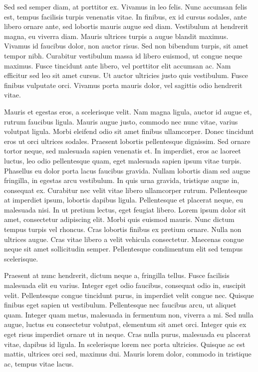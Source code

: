 Sed sed semper diam, at porttitor ex. Vivamus in leo felis. Nunc accumsan felis est, tempus facilisis turpis venenatis vitae. In finibus, ex id cursus sodales, ante libero ornare ante, sed lobortis mauris augue sed diam. Vestibulum at hendrerit magna, eu viverra diam. Mauris ultrices turpis a augue blandit maximus. Vivamus id faucibus dolor, non auctor risus. Sed non bibendum turpis, sit amet tempor nibh. Curabitur vestibulum massa id libero euismod, ut congue neque maximus. Fusce tincidunt ante libero, vel porttitor elit accumsan ac. Nam efficitur sed leo sit amet cursus. Ut auctor ultricies justo quis vestibulum. Fusce finibus vulputate orci. Vivamus porta mauris dolor, vel sagittis odio hendrerit vitae.

Mauris et egestas eros, a scelerisque velit. Nam magna ligula, auctor id augue et, rutrum faucibus ligula. Mauris augue justo, commodo nec nunc vitae, varius volutpat ligula. Morbi eleifend odio sit amet finibus ullamcorper. Donec tincidunt eros ut orci ultrices sodales. Praesent lobortis pellentesque dignissim. Sed ornare tortor neque, sed malesuada sapien venenatis et. In imperdiet, eros ac laoreet luctus, leo odio pellentesque quam, eget malesuada sapien ipsum vitae turpis. Phasellus eu dolor porta lacus faucibus gravida. Nullam lobortis diam sed augue fringilla, in egestas arcu vestibulum. In quis urna gravida, tristique augue in, consequat ex. Curabitur nec velit vitae libero ullamcorper rutrum. Pellentesque at imperdiet ipsum, lobortis dapibus ligula. Pellentesque et placerat neque, eu malesuada nisi. In ut pretium lectus, eget feugiat libero.
Lorem ipsum dolor sit amet, consectetur adipiscing elit. Morbi quis euismod mauris. Nunc dictum tempus turpis vel rhoncus. Cras lobortis finibus ex pretium ornare. Nulla non ultrices augue. Cras vitae libero a velit vehicula consectetur. Maecenas congue neque sit amet sollicitudin semper. Pellentesque condimentum elit sed tempus scelerisque.

Praesent at nunc hendrerit, dictum neque a, fringilla tellus. Fusce facilisis malesuada elit eu varius. Integer eget odio faucibus, consequat odio in, suscipit velit. Pellentesque congue tincidunt purus, in imperdiet velit congue nec. Quisque finibus eget sapien ut vestibulum. Pellentesque nec faucibus arcu, ut aliquet quam. Integer quam metus, malesuada in fermentum non, viverra a mi. Sed nulla augue, luctus eu consectetur volutpat, elementum sit amet orci. Integer quis ex eget risus imperdiet ornare ut in neque. Cras nulla purus, malesuada eu placerat vitae, dapibus id ligula. In scelerisque lorem nec porta ultricies. Quisque ac est mattis, ultrices orci sed, maximus dui. Mauris lorem dolor, commodo in tristique ac, tempus vitae lacus.

